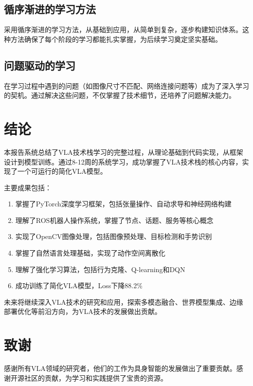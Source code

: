 \documentclass[12pt,a4paper]{article}
\begin{document}
\subsection{循序渐进的学习方法}

采用循序渐进的学习方法，从基础到应用，从简单到复杂，逐步构建知识体系。这种方法确保了每个阶段的学习都能扎实掌握，为后续学习奠定坚实基础。

\subsection{问题驱动的学习}

在学习过程中遇到的问题（如图像尺寸不匹配、网络连接问题等）成为了深入学习的契机。通过解决这些问题，不仅掌握了技术细节，还培养了问题解决能力。

\section{结论}

本报告系统总结了VLA技术栈学习的完整过程，从理论基础到代码实现，从框架设计到模型训练。通过8-12周的系统学习，成功掌握了VLA技术栈的核心内容，实现了一个可运行的简化VLA模型。

主要成果包括：
\begin{enumerate}
    \item 掌握了PyTorch深度学习框架，包括张量操作、自动求导和神经网络构建
    \item 理解了ROS机器人操作系统，掌握了节点、话题、服务等核心概念
    \item 实现了OpenCV图像处理，包括图像预处理、目标检测和手势识别
    \item 掌握了自然语言处理基础，实现了动作空间离散化
    \item 理解了强化学习算法，包括行为克隆、Q-learning和DQN
    \item 成功训练了简化VLA模型，Loss下降88.2\%
\end{enumerate}

未来将继续深入VLA技术的研究和应用，探索多模态融合、世界模型集成、边缘部署优化等前沿方向，为VLA技术的发展做出贡献。

\section*{致谢}

感谢所有VLA领域的研究者，他们的工作为具身智能的发展做出了重要贡献。感谢开源社区的贡献，为学习和实践提供了宝贵的资源。
\end{document}
